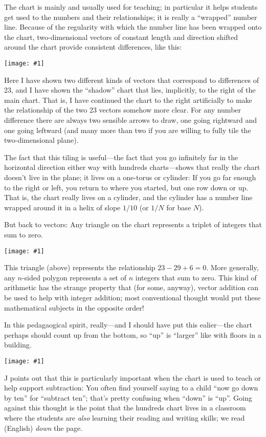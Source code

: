 \documentclass[12pt,pdftex]{article}
\newcommand{\showchart}[1]{\texttt{[image: \#1]}}
\begin{document}
The chart is mainly and usually used for teaching; in particular it
helps students get used to the numbers and their relationships; it is
really a ``wrapped'' number line.  Because of the regularity with
which the number line has been wrapped onto the chart, two-dimensional
vectors of constant length and direction shifted around the chart
provide consistent differences, like this:
\begin{center}
\showchart{hundreds_chart_tr_23.pdf}
\end{center}
Here I have shown two different kinds of vectors that correspond to
differences of 23, and I have shown the ``shadow'' chart that lies,
implicitly, to the right of the main chart.  That is, I have continued
the chart to the right artificially to make the relationship of the
two 23 vectors somehow more clear.  For any number difference there
are always two sensible arrows to draw, one going rightward and one
going leftward (and many more than two if you are willing to fully
tile the two-dimensional plane).

The fact that this tiling is useful---the fact that you go infinitely
far in the horizontal direction either way with hundreds
charts---shows that really the chart doesn't live in the plane; it
lives on a one-torus or cylinder: If you go far enough to the right or
left, you return to where you started, but one row down or up.  That
is, the chart really lives on a cylinder, and the cylinder has a
number line wrapped around it in a helix of slope $1/10$ (or $1/N$ for
base $N$).

But back to vectors: Any triangle on the chart represents a triplet of
integers that sum to zero.
\begin{center}
\showchart{hundreds_chart_triangle.pdf}
\end{center}
This triangle (above) represents the relationship $23-29+6=0$.  More
generally, any $n$-sided polygon represents a set of $n$ integers that
sum to zero.  This kind of arithmetic has the strange property that
(for some, anyway), vector addition can be used to help with integer
addition; most conventional thought would put these mathematical
subjects in the opposite order!

In this pedagaogical spirit, really---and I should have put this
ealier---the chart perhaps should count up from the bottom, so ``up''
is ``larger'' like with floors in a building.
\begin{center}
\showchart{hundreds_chart_bottomup.pdf}
\end{center}
J points out that this is particularly important when the chart is
used to teach or help support subtraction: You often find yourself
saying to a child ``now go down by ten'' for ``subtract ten''; that's
pretty confusing when ``down'' is ``up''.  Going against this thought
is the point that the hundreds chart lives in a classroom where the
students are \emph{also} learning their reading and writing skills; we
read (English) \emph{down} the page.
\end{document}
